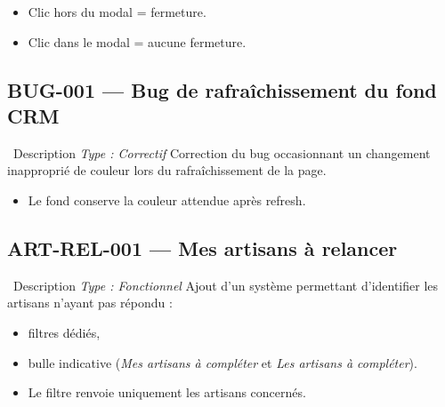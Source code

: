 \documentclass[12pt,a4paper]{article}
\newcommand{\checkmark}{\ding{51}}
\begin{document}
\begin{testbox}
\begin{itemize}[leftmargin=2em, itemsep=2pt]
    \item[\checkmark] Clic hors du modal = fermeture.
    \item[\checkmark] Clic dans le modal = aucune fermeture.
\end{itemize}
\end{testbox}

\subsection{BUG-001 — Bug de rafraîchissement du fond CRM}
\label{subsec:bug-001}

\begin{featurebox}{\faBug\ Description \hfill \textit{Type : Correctif}}
Correction du bug occasionnant un changement inapproprié de couleur lors du rafraîchissement de la page.
\end{featurebox}

\begin{testbox}
\begin{itemize}[leftmargin=2em, itemsep=2pt]
    \item[\checkmark] Le fond conserve la couleur attendue après refresh.
\end{itemize}
\end{testbox}

\subsection{ART-REL-001 — Mes artisans à relancer}
\label{subsec:art-rel-001}

\begin{featurebox}{\faBell\ Description \hfill \textit{Type : Fonctionnel}}
Ajout d'un système permettant d'identifier les artisans n'ayant pas répondu :
\begin{itemize}[leftmargin=2em, itemsep=0pt]
    \item filtres dédiés,
    \item bulle indicative (\textit{Mes artisans à compléter} et \textit{Les artisans à compléter}).
\end{itemize}
\end{featurebox}

\begin{testbox}
\begin{itemize}[leftmargin=2em, itemsep=2pt]
    \item[\checkmark] Le filtre renvoie uniquement les artisans concernés.
\end{itemize}
\end{testbox}
\end{document}
